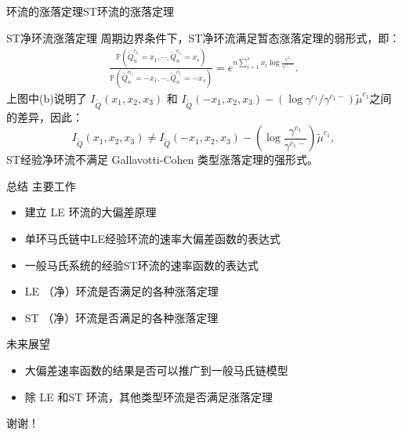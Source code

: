 \documentclass{beamer}
\newcommand{\Pnum}{\mathbb{P}}
\begin{document}
\begin{frame}{环流的涨落定理}{ST环流的涨落定理}
	\begin{block}{ST净环流涨落定理}
		周期边界条件下，ST净环流满足暂态涨落定理的弱形式，即：
		\begin{equation*}\label{weak2}
			\begin{split}
			\frac{\Pnum\left(\tilde{Q}^{c_{l_1}}_n=x_1,\cdots, \tilde{Q}^{c_{l_s}}_n=x_{s}\right)}
			{\Pnum\left(\tilde{Q}^{c_{l_1}}_n=-x_1,\cdots, \tilde{Q}^{c_{l_s}}_n=-x_{s}\right)}
			=e^{n\sum_{i=1}^{s}x_i\log\frac{\gamma^{c_{l_i}}}{\gamma^{c_{l_i}-}}}.
			\end{split}
		\end{equation*}
		上图中(b)说明了 $I_{\tilde{Q}}(x_1, x_2, x_3)$ 和 $ I_{\tilde{Q}}(-x_1, x_2, x_3) -\left(\log \gamma^{c_1} / \gamma^{c_1-}\right)\tilde{\mu}^{c_1}$之间的差异，因此：
		\begin{equation*}
			I_{\tilde{Q}}(x_1, x_2, x_3) \neq I_{\tilde{Q}}(-x_1, x_2, x_3) -\left(\log\frac{\gamma^{c_1}}{\gamma^{c_1-}}\right)\tilde{\mu}^{c_1},
		\end{equation*}
		ST经验净环流不满足 Gallavotti-Cohen 类型涨落定理的强形式。
	\end{block}
\end{frame}

\begin{frame}{总结}
主要工作
\begin{itemize}
	\item 建立 LE 环流的大偏差原理
  	\item 单环马氏链中LE经验环流的速率大偏差函数的表达式
	\item 一般马氏系统的经验ST环流的速率函数的表达式
 	\item LE （净）环流是否满足的各种涨落定理
  	\item ST （净）环流是否满足的各种涨落定理
\end{itemize}
	
\end{frame}

\begin{frame}{未来展望}
	\begin{itemize}
		\item 大偏差速率函数的结果是否可以推广到一般马氏链模型
  		\item 除 LE 和ST 环流，其他类型环流是否满足涨落定理
	\end{itemize}
\end{frame}

\begin{frame}
	\begin{center}
		\Huge 谢谢！
	\end{center}
\end{frame}
\end{document}
